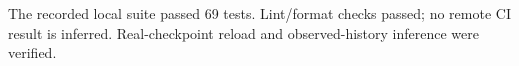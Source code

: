 The recorded local suite passed 69 tests. Lint/format checks passed; no remote CI result is inferred. Real-checkpoint reload and observed-history inference were verified.
